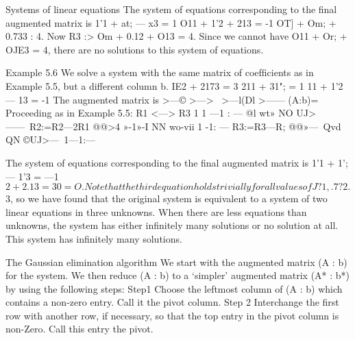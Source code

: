 \documentclass{beamer}
\begin{document}
\begin{frame}

Systems of linear equations
The system of equations corresponding to the ﬁnal augmented
matrix is
1'1 + at; — x3 = 1
O11 + 1'2 + 213 = -1
OT] + Om; + 0.733 : 4.
Now R3 :> Om + 0.12 + O13 = 4. Since we cannot have
O11 + Or; + OJE3 = 4, there are no solutions to this system of
equations.

\end{frame}
\begin{frame}
Example 5.6 We solve a system with the same matrix of coefﬁcients as
in Example 5.5, but a different column b.
IE2 + 2173 = 3
211 + 31"; = 1
11 + 1'2 — 13 = -1
The augmented matrix is
>—\I\7©
>—\ua>~
>—l(Dl\7
>—\>—\UJ
(A:b)=
Proceeding as in Example 5.5:
R1 <—> R3
1 1 —1 : —
@l\J
wt»
NO
UJ>—\>—\
R2:=R2—2R1
@@>4
»-1»-I
NN
wo-vii
1 -1: —
R3:=R3—R;
@@»—\
Qvd
QN
©UJ>—\
1—1:—
\end{frame}
\begin{frame}
The system of equations corresponding to the ﬁnal augmented
matrix is
1'1 + 1'; — 1'3 = —1
$2 + 2.13 = 3
0 = O.
Note that the third equation holds trivially for all values of J?1,.7?2. $3,
so we have found that the original system is equivalent to a system
of two linear equations in three unknowns. When there are less
equations than unknowns, the system has either inﬁnitely many
solutions or no solution at all. This system has inﬁnitely many
solutions.

\end{frame}
\begin{frame}
The Gaussian elimination algorithm
We start with the augmented matrix (A : b) for the system. We then
reduce (A : b) to a ‘simpler’ augmented matrix (A* : b*) by using the
following steps:
Step1 Choose the leftmost column of (A : b) which contains a
non-zero entry. Call it the pivot column.
Step 2 Interchange the ﬁrst row with another row, if necessary,
so that the top entry in the pivot column is non-Zero. Call
this entry the pivot.
\end{frame}
\end{document}
